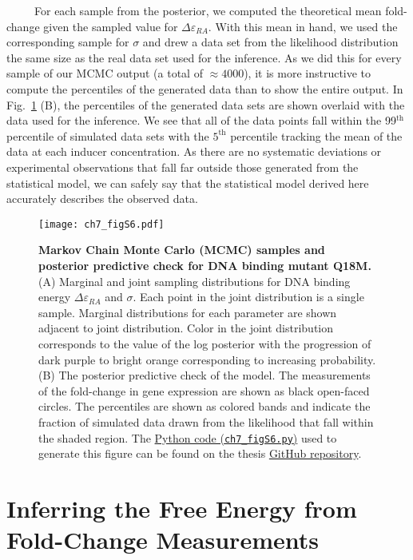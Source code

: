 \documentclass[12pt]{caltech_thesis}
\begin{document}
~~~~~For each sample from the posterior, we computed the theoretical
mean fold-change given the sampled value for \(\Delta\varepsilon_{RA}\).
With this mean in hand, we used the corresponding sample for \(\sigma\)
and drew a data set from the likelihood distribution the same size as
the real data set used for the inference. As we did this for every
sample of our MCMC output (a total of \(\approx 4000\)), it is more
instructive to compute the percentiles of the generated data than to
show the entire output. In Fig.~\ref{fig:epRA_ppc} (B), the percentiles
of the generated data sets are shown overlaid with the data used for the
inference. We see that all of the data points fall within the
99\(^\text{th}\) percentile of simulated data sets with the
\(5^\text{th}\) percentile tracking the mean of the data at each inducer
concentration. As there are no systematic deviations or experimental
observations that fall far outside those generated from the statistical
model, we can safely say that the statistical model derived here
accurately describes the observed data.

\hypertarget{fig:epRA_ppc}{%
\begin{figure}
\centering
\texttt{[image: ch7\_figS6.pdf]}
\caption[{Markov chain Monte Carlo samples and posterior predictive
check for DNA binding mutant Q18M.}]{\textbf{Markov Chain Monte Carlo
(MCMC) samples and posterior predictive check for DNA binding mutant
Q18M.} (A) Marginal and joint sampling distributions for DNA binding
energy \(\Delta\varepsilon_{RA}\) and \(\sigma\). Each point in the
joint distribution is a single sample. Marginal distributions for each
parameter are shown adjacent to joint distribution. Color in the joint
distribution corresponds to the value of the log posterior with the
progression of dark purple to bright orange corresponding to increasing
probability. (B) The posterior predictive check of the model. The
measurements of the fold-change in gene expression are shown as black
open-faced circles. The percentiles are shown as colored bands and
indicate the fraction of simulated data drawn from the likelihood that
fall within the shaded region. The
\href{https://github.com/gchure/phd/blob/master/src/chapter_07/code/ch7_figS6.py}{Python
code (\texttt{ch7\_figS6.py})} used to generate this figure can be found
on the thesis \href{https://github.com/gchure/phd}{GitHub repository}.}
\label{fig:epRA_ppc}
\end{figure}
}

\hypertarget{inferring-the-free-energy-from-fold-change-measurements}{%
\section{Inferring the Free Energy from Fold-Change
Measurements}\label{inferring-the-free-energy-from-fold-change-measurements}}
\end{document}
